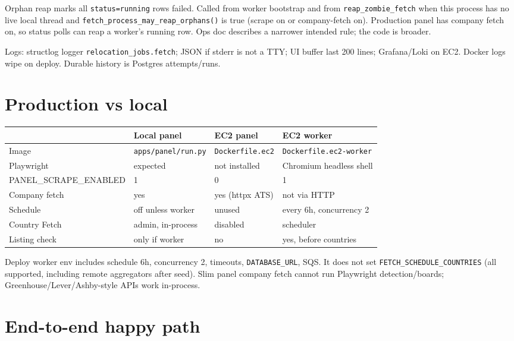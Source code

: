 \documentclass[11pt,a4paper]{article}
\begin{document}
Orphan reap marks all \texttt{status=running} rows failed. Called from worker
bootstrap and from \texttt{reap\_zombie\_fetch} when this process has no live
local thread and \texttt{fetch\_process\_may\_reap\_orphans()} is true (scrape
on or company-fetch on). Production panel has company fetch on, so status
polls can reap a worker's running row. Ops doc describes a narrower intended
rule; the code is broader.

Logs: structlog logger \texttt{relocation\_jobs.fetch}; JSON if stderr is not
a TTY; UI buffer last 200 lines; Grafana/Loki on EC2. Docker logs wipe on
deploy. Durable history is Postgres attempts/runs.

\section{Production vs local}

\begin{center}
\small
\begin{tabularx}{\textwidth}{l X X X}
  \toprule
  & \textbf{Local panel} & \textbf{EC2 panel} & \textbf{EC2 worker} \\
  \midrule
  Image &
    \texttt{apps/panel/run.py} &
    \texttt{Dockerfile.ec2} &
    \texttt{Dockerfile.ec2-worker} \\
  Playwright &
    expected &
    not installed &
    Chromium headless shell \\
  PANEL\_SCRAPE\_ENABLED &
    1 &
    0 &
    1 \\
  Company fetch &
    yes &
    yes (httpx ATS) &
    not via HTTP \\
  Schedule &
    off unless worker &
    unused &
    every 6h, concurrency 2 \\
  Country Fetch &
    admin, in-process &
    disabled &
    scheduler \\
  Listing check &
    only if worker &
    no &
    yes, before countries \\
  \bottomrule
\end{tabularx}
\end{center}

Deploy worker env includes schedule 6h, concurrency 2, timeouts,
\texttt{DATABASE\_URL}, SQS. It does not set
\texttt{FETCH\_SCHEDULE\_COUNTRIES} (all supported, including remote
aggregators after seed). Slim panel company fetch cannot run Playwright
detection/boards; Greenhouse/Lever/Ashby-style APIs work in-process.

\section{End-to-end happy path}
\end{document}
